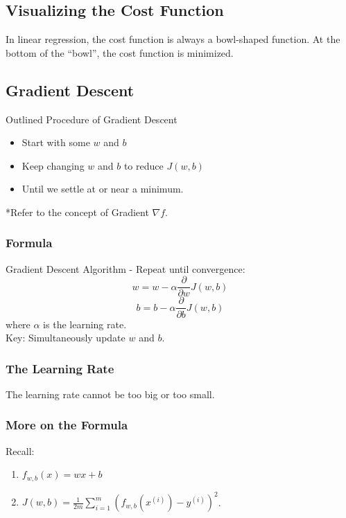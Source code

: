 \documentclass[12pt,a4paper]{article}
\begin{document}
\subsection{Visualizing the Cost Function}
\quad In linear regression, the cost function is always a bowl-shaped function. At the bottom of the “bowl”, the cost function is minimized. 

\subsection{Gradient Descent}
\begin{rmkbox}{Outlined Procedure of Gradient Descent}
	\begin{itemize}
		\item Start with some $w$ and $b$
		\item Keep changing $w$ and $b$ to reduce $J(w,b)$
		\item Until we settle at or near a minimum.
	\end{itemize}
\end{rmkbox}
*Refer to the concept of Gradient $\nabla f$.

\subsubsection{Formula}
\begin{rmkbox}{Gradient Descent Algorithm}
	- Repeat until convergence: 
	$$w=w-\alpha\frac{\partial}{\partial w}J(w,b)$$
	$$b=b-\alpha\frac{\partial}{\partial b}J(w,b)$$
	where $\alpha$ is the learning rate. \\
	Key: Simultaneously update $w$ and $b$.
\end{rmkbox}

\subsubsection{The Learning Rate}
\quad The learning rate cannot be too big or too small.

\subsubsection{More on the Formula}
\quad Recall:
\begin{enumerate}
	\item $f_{w,b}(x)=wx+b$
	\item $J(w,b)=\frac{1}{2m}\sum_{i=1}^m\left(f_{w,b}\left(x^{(i)}\right)-y^{(i)}\right)^2$.
\end{enumerate}
\end{document}
